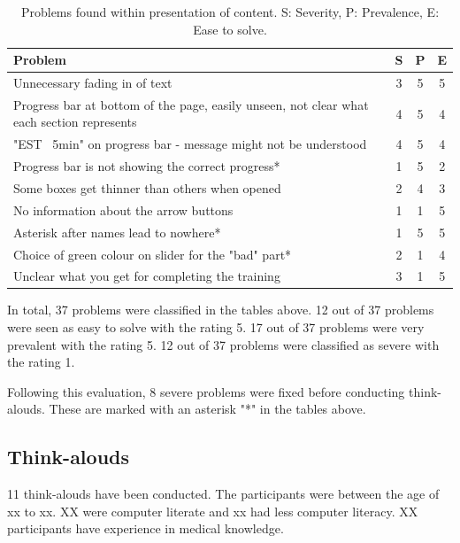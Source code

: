 \documentclass{sigchi}
\begin{document}
\begin{table}[H]
    \centering
    \begin{tabular}{|m{6.5cm}|c|c|c|}
    \hline
        \textbf{Problem} & \textbf{S} & \textbf{P} & \textbf{E}\\
    \hline
         Unnecessary fading in of text & 3 & 5 & 5\\
    \hline
         Progress bar at bottom of the page, easily unseen, not clear what each section represents & 4 & 5 & 4\\
    \hline
         "EST ~5min" on progress bar - message might not be understood & 4 & 5 & 4\\
    \hline
         Progress bar is not showing the correct progress* & 1 & 5 & 2\\
    \hline
         Some boxes get thinner than others when opened & 2 & 4 & 3\\
    \hline
         No information about the arrow buttons & 1 & 1 & 5\\
    \hline
         Asterisk after names lead to nowhere* & 1 & 5 & 5\\
    \hline
         Choice of green colour on slider for the "bad" part* & 2 & 1 & 4\\
    \hline
         Unclear what you get for completing the training & 3 & 1 & 5\\
    \hline
    \end{tabular}
    \caption{Problems found within presentation of content. S: Severity, P: Prevalence, E: Ease to solve.}
    \label{tab:content}
\end{table}

In total, 37 problems were classified in the tables above. 12 out of 37 problems were seen as easy to solve with the rating 5. 17 out of 37 problems were very prevalent with the rating 5. 12 out of 37 problems were classified as severe with the rating 1. 

Following this evaluation, 8 severe problems were fixed before conducting think-alouds. These are marked with an asterisk "*" in the tables above.

\subsection{Think-alouds}
11 think-alouds have been conducted. The participants were between the age of xx to xx. XX were computer literate and xx had less computer literacy. XX participants have experience in medical knowledge. 
\end{document}
